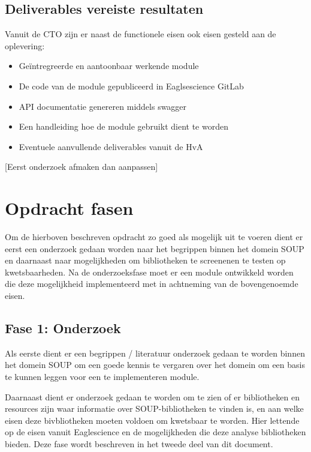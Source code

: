 \subsection{Deliverables vereiste resultaten}\label{subsec:deliverables-vereiste-resultaten}
Vanuit de CTO zijn er naast de functionele eisen ook eisen gesteld aan de oplevering:
\begin{itemize}
\item Geïntregreerde en aantoonbaar werkende module
\item De code van de module gepubliceerd in Eaglsescience GitLab
\item API documentatie genereren middels swagger
\item Een handleiding hoe de module gebruikt dient te worden
\item Eventuele aanvullende deliverables vanuit de HvA
\end{itemize}



[Eerst onderzoek afmaken dan aanpassen]
\section{Opdracht fasen}\label{sec:opdracht-fasen}
Om de hierboven beschreven opdracht zo goed als mogelijk uit te voeren dient er eerst een onderzoek gedaan worden naar het begrippen binnen het domein SOUP en daarnaast naar mogelijkheden om bibliotheken te screenenen te testen op kwetsbaarheden.
Na de onderzoeksfase  moet er een module ontwikkeld worden die deze mogelijkheid implementeerd met in achtneming van de bovengenoemde eisen.

\subsection{Fase 1: Onderzoek} \label{subsec:fase-1:-onderzoek}
Als eerste dient er een begrippen / literatuur onderzoek gedaan te worden binnen het domein SOUP om een goede kennis te vergaren over het domein om een basis te kunnen leggen voor een te implementeren module.

Daarnaast dient er onderzoek gedaan te worden om te zien of er bibliotheken en resources zijn waar informatie over SOUP-bibliotheken te vinden is, en aan welke eisen deze bivbliotheken moeten voldoen om kwetsbaar te worden.
Hier lettende op de eisen vanuit Eaglescience en de mogelijkheden die deze analyse bibliotheken bieden.
Deze fase wordt beschreven in het tweede deel van dit document.

